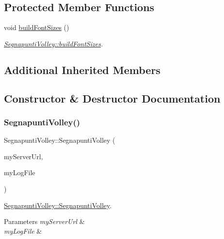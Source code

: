 \subsection*{Protected Member Functions}
\begin{DoxyCompactItemize}
\item 
\mbox{\label{classSegnapuntiVolley_acd0da2cc6a4b353930a14762340fbc45}} 
void \mbox{\hyperlink{classSegnapuntiVolley_acd0da2cc6a4b353930a14762340fbc45}{build\+Font\+Sizes}} ()
\begin{DoxyCompactList}\small\item\em \mbox{\hyperlink{classSegnapuntiVolley_acd0da2cc6a4b353930a14762340fbc45}{Segnapunti\+Volley\+::build\+Font\+Sizes}}. \end{DoxyCompactList}\end{DoxyCompactItemize}
\subsection*{Additional Inherited Members}


\subsection{Constructor \& Destructor Documentation}
\mbox{\label{classSegnapuntiVolley_a2de6c112e896299739e17d8f2f297b5f}} 
\subsubsection{\texorpdfstring{Segnapunti\+Volley()}{SegnapuntiVolley()}}
{\footnotesize\ttfamily Segnapunti\+Volley\+::\+Segnapunti\+Volley (\begin{DoxyParamCaption}\item[{const Q\+String \&}]{my\+Server\+Url,  }\item[{Q\+File $\ast$}]{my\+Log\+File }\end{DoxyParamCaption})}



\mbox{\hyperlink{classSegnapuntiVolley_a2de6c112e896299739e17d8f2f297b5f}{Segnapunti\+Volley\+::\+Segnapunti\+Volley}}. 


\begin{DoxyParams}{Parameters}
{\em my\+Server\+Url} & \\
\hline
{\em my\+Log\+File} & \\
\hline
\end{DoxyParams}


